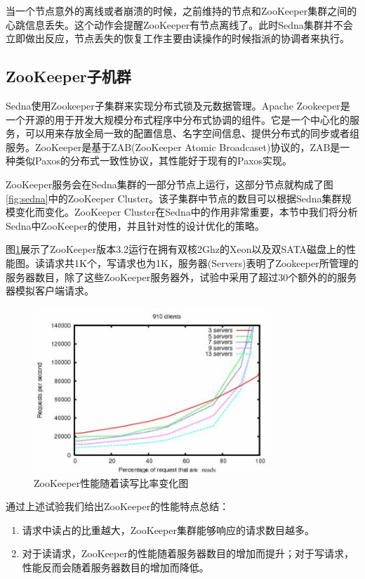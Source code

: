 当一个节点意外的离线或者崩溃的时候，之前维持的节点和ZooKeeper集群之间的心跳信息丢失。这个动作会提醒ZooKeeper有节点离线了。此时Sedna集群并不会立即做出反应，节点丢失的恢复工作主要由读操作的时候指派的协调者来执行。

\subsection{ZooKeeper子机群}
Sedna使用Zookeeper\cite{hunt2010zookeeper}子集群来实现分布式锁及元数据管理。Apache Zookeeper是一个开源的用于开发大规模分布式程序中分布式协调的组件。它是一个中心化的服务，可以用来存放全局一致的配置信息、名字空间信息、提供分布式的同步或者组服务。ZooKeeper是基于ZAB(ZooKeeper Atomic Broadcaset)\cite{junqueira2011zab}协议的，ZAB是一种类似Paxos的分布式一致性协议，其性能好于现有的Paxos\cite{lamport2001paxos, lamport2006fast}实现。

ZooKeeper服务会在Sedna集群的一部分节点上运行，这部分节点就构成了图\ref{fig:sedna}中的ZooKeeper Cluster。该子集群中节点的数目可以根据Sedna集群规模变化而变化。ZooKeeper Cluster在Sedna中的作用非常重要，本节中我们将分析Sedna中ZooKeeper的使用，并且针对性的设计优化的策略。

图\ref{fig:zkper}展示了ZooKeeper版本3.2运行在拥有双核2Ghz的Xeon以及双SATA磁盘上的性能图。读请求共1K个，写请求也为1K，服务器(Servers)表明了Zookeeper所管理的服务器数目，除了这些ZooKeeper服务器外，试验中采用了超过30个额外的的服务器模拟客户端请求。

\begin{figure}[h!]
  \centering
  \includegraphics[width=3.5in]{../figures/zkp.pdf}
  \caption{ZooKeeper性能随着读写比率变化图}
  \label{fig:zkper}
\end{figure}

通过上述试验我们给出ZooKeeper的性能特点总结：

\begin{enumerate}
\item 请求中读占的比重越大，ZooKeeper集群能够响应的请求数目越多。
\item 对于读请求，ZooKeeper的性能随着服务器数目的增加而提升；对于写请求，性能反而会随着服务器数目的增加而降低。
\end{enumerate}

